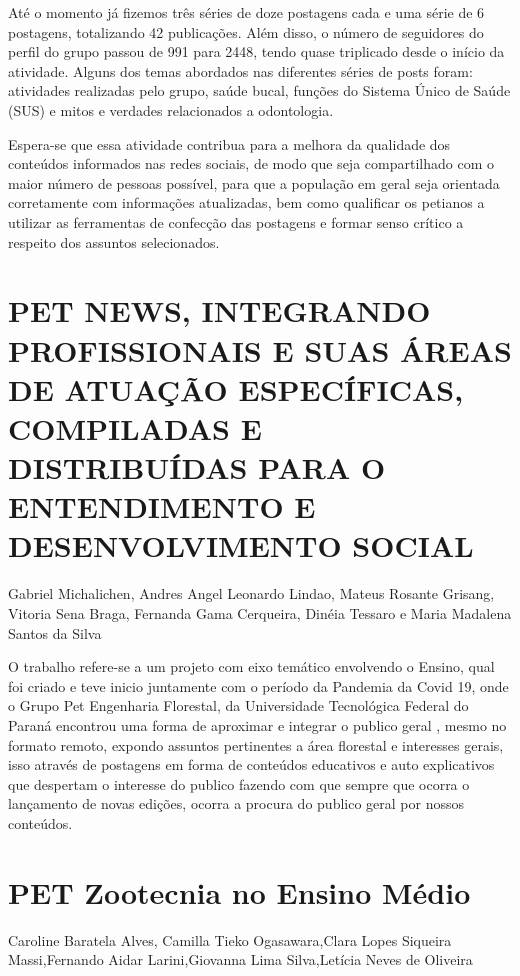 Até o momento já fizemos três séries de doze postagens cada e uma série de 6 postagens, totalizando 42 publicações. Além disso, o número de seguidores do perfil do grupo passou de 991 para 2448, tendo quase triplicado desde o início da atividade. Alguns dos temas abordados nas diferentes séries de posts foram: atividades realizadas pelo grupo, saúde bucal, funções do Sistema Único de Saúde (SUS) e mitos e verdades relacionados a odontologia.

Espera-se que essa atividade contribua para a melhora da qualidade dos conteúdos informados nas redes sociais, de modo que seja compartilhado com o maior número de pessoas possível, para que a população em geral seja orientada corretamente com informações atualizadas, bem como qualificar os petianos a utilizar as ferramentas de confecção das postagens e formar senso crítico a respeito dos assuntos selecionados.



\section{PET NEWS, INTEGRANDO PROFISSIONAIS E SUAS ÁREAS DE ATUAÇÃO ESPECÍFICAS, COMPILADAS E DISTRIBUÍDAS PARA O ENTENDIMENTO E DESENVOLVIMENTO SOCIAL}

Gabriel Michalichen, Andres Angel Leonardo Lindao, Mateus Rosante Grisang, Vitoria Sena Braga, Fernanda Gama Cerqueira, Dinéia Tessaro e Maria Madalena Santos da Silva

O trabalho refere-se a um projeto  com eixo temático envolvendo o Ensino, qual foi criado e  teve  inicio juntamente com o período da Pandemia da Covid 19, onde o  Grupo Pet Engenharia Florestal, da Universidade Tecnológica Federal do Paraná encontrou  uma forma de aproximar e integrar  o publico geral  , mesmo no formato remoto, expondo assuntos pertinentes a área florestal e interesses gerais, isso através de postagens em forma de conteúdos educativos e auto explicativos que despertam o interesse do publico fazendo  com que sempre que ocorra o lançamento de novas edições, ocorra a procura do publico geral por nossos conteúdos.



\section{PET Zootecnia no Ensino Médio}

Caroline Baratela Alves, Camilla Tieko Ogasawara,Clara Lopes Siqueira Massi,Fernando Aidar Larini,Giovanna Lima Silva,Letícia Neves de Oliveira

